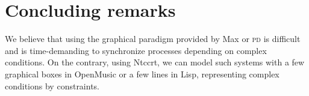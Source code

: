 \documentclass[english]{llncs}
\begin{document}
\section{Concluding remarks}
We believe that using the graphical paradigm provided by Max or \textsc{pd} is difficult and is time-demanding to synchronize processes depending on complex conditions. On the contrary, using Ntccrt, we can model such systems with a few graphical boxes in OpenMusic or a few lines in Lisp, representing complex conditions by constraints.



\let\oldbibliography\thebibliography
\renewcommand{\thebibliography}[1]{\oldbibliography{#1}\setlength{\itemsep}{0pt}}



{\scriptsize

}
\end{document}
